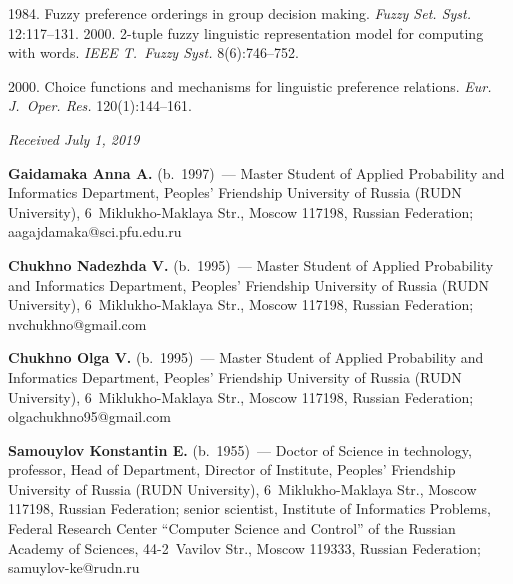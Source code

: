 \begin{multicols}{2}
{{\begin{thebibliography}{99}
 1984. Fuzzy preference orderings in group decision making. 
\textit{Fuzzy Set. Syst.} 12:117--131.
 2000. 2-tuple fuzzy linguistic representation model for 
computing with words. \textit{IEEE T.~Fuzzy Syst.} 8(6):746--752.

 2000. Choice functions and mechanisms for 
linguistic preference relations. \textit{Eur. J.~Oper. Res.} 120(1):144--161.
\end{thebibliography}

 }
 }

\end{multicols}


\hfill{\small\textit{Received July 1, 2019}}



\Contr

\noindent
\textbf{Gaidamaka Anna A.} (b.\ 1997)~--- Master Student of 
Applied Probability and Informatics Department, Peoples' 
Friendship University of Russia (RUDN University), 6~Miklukho-Maklaya Str., Moscow 117198, Russian Federation; 
\mbox{aagajdamaka@sci.pfu.edu.ru}

\vspace*{3pt}

\noindent
\textbf{Chukhno Nadezhda V.} (b.\ 1995)~--- Master Student of Applied Probability and 
Informatics Department, Peoples' Friendship University of Russia (RUDN University), 
6~Miklukho-Maklaya Str., Moscow 117198, Russian Federation; \mbox{nvchukhno@gmail.com}

\vspace*{3pt}

\noindent
\textbf{Chukhno Olga V.} (b.\ 1995)~--- Master Student of Applied Probability and 
Informatics 
Department, Peoples' Friendship University of Russia (RUDN University), 6~Miklukho-Maklaya 
Str., Moscow 117198, Russian Federation; \mbox{olgachukhno95@gmail.com}

\vspace*{3pt}

\noindent
\textbf{Samouylov Konstantin E.} (b.\ 1955)~--- Doctor of Science in technology, professor, 
Head of Department, Director of Institute, Peoples' Friendship University of Russia (RUDN 
University), 6~Miklukho-Maklaya Str., Moscow 117198, Russian Federation; senior scientist, 
Institute of Informatics Problems, Federal Research Center ``Computer Science and Control'' of the 
Russian Academy of Sciences, 44-2~Vavilov Str., Moscow 119333, Russian Federation; 
\mbox{samuylov-ke@rudn.ru}

